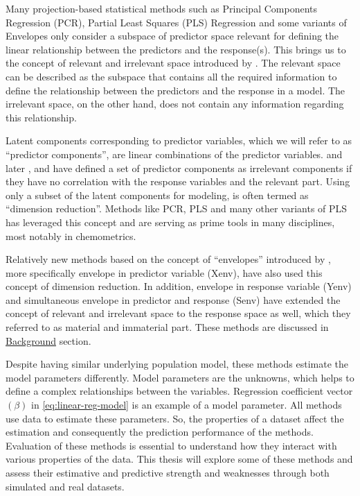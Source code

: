 \documentclass[11pt,twoside,openright,titlepage,
  headinclude,footinclude,BCOR=5mm,
  numbers=noenddot,cleardoublepage=empty,
  tablecaptionabove, dottedtoc,
  bibliography=totoc,paper=a4]{scrreprt}
\begin{document}
Many projection-based statistical methods such as Principal Components Regression (PCR), Partial Least Squares (PLS) Regression and some variants of Envelopes only consider a subspace of predictor space relevant for defining the linear relationship between the predictors and the response(s). This brings us to the concept of relevant and irrelevant space introduced by \citet{Naes1985}. The relevant space can be described as the subspace that contains all the required information to define the relationship between the predictors and the response in a model. The irrelevant space, on the other hand, does not contain any information regarding this relationship.

Latent components corresponding to predictor variables, which we will refer to as ``predictor components'', are linear combinations of the predictor variables. \citet{Naes1985} and later \citet{helland1990partial}, \citet{naes1993relevant} and \citet{Helland1994b} have defined a set of predictor components as irrelevant components if they have no correlation with the response variables and the relevant part. Using only a subset of the latent components for modeling, is often termed as ``dimension reduction''. Methods like PCR, PLS and many other variants of PLS has leveraged this concept and are serving as prime tools in many disciplines, most notably in chemometrics.

Relatively new methods based on the concept of ``envelopes'' introduced by \citet{Cook2007a}, more specifically envelope in predictor variable (Xenv), have also used this concept of dimension reduction. In addition, envelope in response variable (Yenv) and simultaneous envelope in predictor and response (Senv) have extended the concept of relevant and irrelevant space to the response space as well, which they referred to as material and immaterial part. These methods are discussed in \protect\hyperlink{background}{Background} section.

Despite having similar underlying population model, these methods estimate the model parameters differently. Model parameters are the unknowns, which helps to define a complex relationships between the variables. Regression coefficient vector \((\beta)\) in \eqref{eq:linear-reg-model} is an example of a model parameter. All methods use data to estimate these parameters. So, the properties of a dataset affect the estimation and consequently the prediction performance of the methods. Evaluation of these methods is essential to understand how they interact with various properties of the data. This thesis will explore some of these methods and assess their estimative and predictive strength and weaknesses through both simulated and real datasets.
\end{document}
